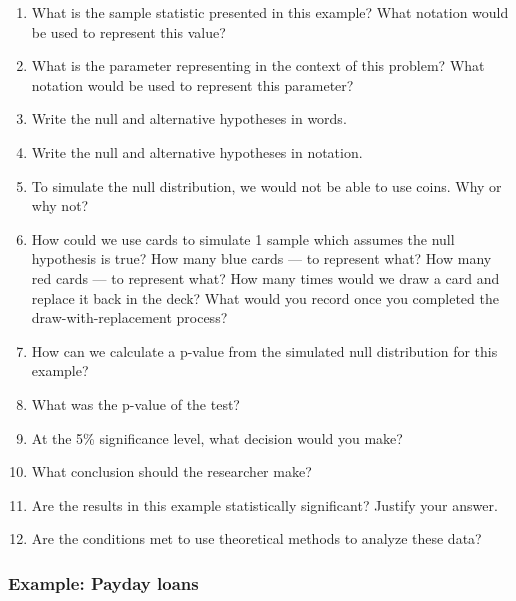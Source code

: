 \documentclass[
]{report}
\newcommand{\rgs}{\vspace{12pt}} %
\begin{document}
\begin{enumerate}
\def\labelenumi{\arabic{enumi}.}
\item
  What is the sample statistic presented in this example? What notation would be used to represent this value?
  \rgs
\item
  What is the parameter representing in the context of this problem? What notation would be used to represent this parameter?
  \rgs
  \rgs
\item
  Write the null and alternative hypotheses in words.
  \rgs
  \rgs
\item
  Write the null and alternative hypotheses in notation.
  \rgs
\item
  To simulate the null distribution, we would not be able to use coins. Why or why not?
  \rgs
  \rgs
\item
  How could we use cards to simulate 1 sample which assumes the null hypothesis is true? How many blue cards --- to represent what? How many red cards --- to represent what? How many times would we draw a card and replace it back in the deck? What would you record once you completed the draw-with-replacement process?
  \rgs
  \rgs
  \rgs
\item
  How can we calculate a p-value from the simulated null distribution for this example?
  \rgs
  \rgs
\item
  What was the p-value of the test?
  \rgs
\item
  At the 5\% significance level, what decision would you make?
  \rgs
\item
  What conclusion should the researcher make?
  \rgs
  \rgs
\item
  Are the results in this example statistically significant? Justify your answer.
  \rgs
\item
  Are the conditions met to use theoretical methods to analyze these data?
  \rgs
  \rgs
\end{enumerate}

\hypertarget{example-payday-loans}{%
\subsubsection*{Example: Payday loans}\label{example-payday-loans}}
\end{document}
